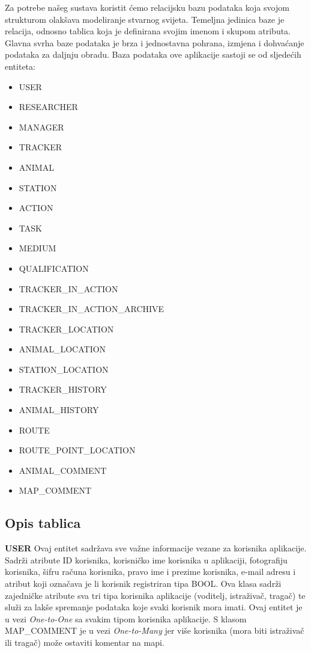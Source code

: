 				\noindent Za potrebe našeg sustava koristit ćemo relacijsku bazu podataka koja svojom strukturom olakšava modeliranje stvarnog svijeta. Temeljna jedinica baze je relacija, odnosno tablica koja je definirana svojim imenom i skupom atributa. Glavna svrha baze podataka je brza i jednostavna pohrana, izmjena i dohvaćanje podataka za daljnju obradu. Baza podataka ove aplikacije sastoji se od sljedećih entiteta:
				
				\begin{itemize}
					\item USER
					\item RESEARCHER
					\item MANAGER
					\item TRACKER
					\item ANIMAL
					\item STATION
					\item ACTION
					\item TASK
					\item MEDIUM
					\item QUALIFICATION
					\item TRACKER\_IN\_ACTION
					\item TRACKER\_IN\_ACTION\_ARCHIVE
					\item TRACKER\_LOCATION
					\item ANIMAL\_LOCATION
					\item STATION\_LOCATION
					\item TRACKER\_HISTORY
					\item ANIMAL\_HISTORY
					\item ROUTE
					\item ROUTE\_POINT\_LOCATION
					\item ANIMAL\_COMMENT
					\item MAP\_COMMENT
				\end{itemize}
				
		\subsection{Opis tablica}
				
				
				\noindent \textbf{USER} \hspace{1em} Ovaj entitet sadržava sve važne informacije vezane za korisnika aplikacije. Sadrži atribute ID korisnika, korisničko ime korisnika u aplikaciji, fotografiju korisnika, šifru računa korisnika, pravo ime i prezime korisnika, e-mail adresu i atribut koji označava je li korisnik registriran tipa BOOL.  Ova klasa sadrži zajedničke atribute sva tri tipa korisnika aplikacije (voditelj, istraživač, tragač) te služi za lakše spremanje podataka koje svaki korisnik mora imati. Ovaj entitet je u vezi \textit{One-to-One} sa svakim tipom korisnika aplikacije. S klasom MAP\_COMMENT je u vezi \textit{One-to-Many} jer više korisnika (mora biti istraživač ili tragač) može ostaviti komentar na mapi.
				
